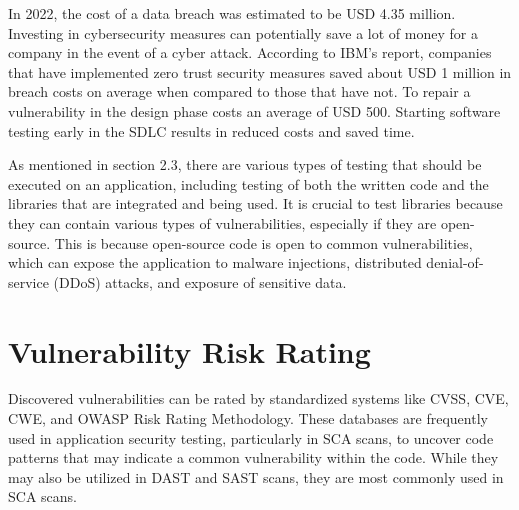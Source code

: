 In 2022, the cost of a data breach was estimated to be USD 4.35 million. Investing in cybersecurity measures can potentially save a lot of money for a company in the event of a cyber attack. According to IBM's report\cite{databreach}, companies that have implemented zero trust security measures saved about USD 1 million in breach costs on average when compared to those that have not. To repair a vulnerability in the design phase costs an average of USD 500\cite{fixvulnerability}. Starting software testing early in the SDLC results in reduced costs and saved time. 

As mentioned in section 2.3, there are various types of testing that should be executed on an application, including testing of both the written code and the libraries that are integrated and being used. It is crucial to test libraries because they can contain various types of vulnerabilities, especially if they are open-source. This is because open-source code is open to common vulnerabilities, which can expose the application to malware injections, distributed denial-of-service (DDoS) attacks, and exposure of sensitive data. \cite{testlibaries}



\section{Vulnerability Risk Rating}
Discovered vulnerabilities can be rated by standardized systems like CVSS, CVE, CWE, and OWASP Risk Rating Methodology. These databases are frequently used in application security testing, particularly in SCA scans, to uncover code patterns that may indicate a common vulnerability within the code. While they may also be utilized in DAST and SAST scans, they are most commonly used in SCA scans. 


